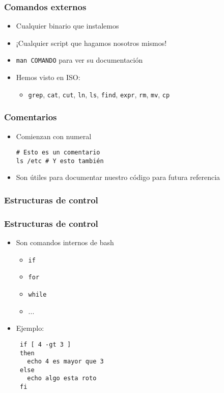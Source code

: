 \begin{frame}
  \frametitle{Comandos externos}
  \begin{itemize}
    \item Cualquier binario que instalemos
    \item ¡Cualquier script que hagamos nosotros mismos!
    \item \texttt{man COMANDO} para ver su documentación
    \item Hemos visto en ISO:
    \begin{itemize}
      \item \texttt{grep}, \texttt{cat}, \texttt{cut}, \texttt{ln}, \texttt{ls},
        \texttt{find}, \texttt{expr}, \texttt{rm}, \texttt{mv}, \texttt{cp}
    \end{itemize}
  \end{itemize}
\end{frame}

\begin{frame}[fragile]
  \frametitle{Comentarios}
  \begin{itemize}
    \item Comienzan con numeral
    \begin{lstlisting}
# Esto es un comentario
ls /etc # Y esto también
    \end{lstlisting}
    \item Son útiles para documentar nuestro código para futura referencia
  \end{itemize}
\end{frame}

\subsubsection{Estructuras de control}

\begin{frame}[fragile]
  \frametitle{Estructuras de control}
  \begin{itemize}
    \item Son comandos internos de bash
    \begin{itemize}
      \item \texttt{if}
      \item \texttt{for}
      \item \texttt{while}
      \item ...
    \end{itemize}
    \item Ejemplo:
   \begin{lstlisting}
 if [ 4 -gt 3 ]
 then
   echo 4 es mayor que 3
 else
   echo algo esta roto
 fi
   \end{lstlisting}
  \end{itemize}
\end{frame}

